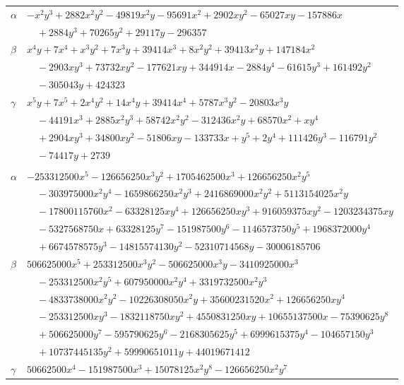 \documentclass[11pt]{article}
\begin{document}
\begin{longtable}{@{}ll@{}}
$\alpha$ & $-x^{2}y^{3}+2882x^{2}y^{2}-49819x^{2}y-95691x^{2}+2902xy^{2}-65027xy-157886x$\\
 & $\quad +2884y^{3}+70265y^{2}+29117y-296357$\\
$\beta$ & $x^{4}y+7x^{4}+x^{3}y^{2}+7x^{3}y+39414x^{3}+8x^{2}y^{2}+39413x^{2}y+147184x^{2}$\\
 & $\quad -2903xy^{3}+73732xy^{2}-177621xy+344914x-2884y^{4}-61615y^{3}+161492y^{2}$\\
 & $\quad -305043y+424323$\\
$\gamma$ & $x^{5}y+7x^{5}+2x^{4}y^{2}+14x^{4}y+39414x^{4}+5787x^{3}y^{2}-20803x^{3}y$\\
 & $\quad -44191x^{3}+2885x^{2}y^{3}+58742x^{2}y^{2}-312436x^{2}y+68570x^{2}+xy^{4}$\\
 & $\quad +2904xy^{3}+34800xy^{2}-51806xy-133733x+y^{5}+2y^{4}+111426y^{3}-116791y^{2}$\\
 & $\quad -74417y+2739$\\
\addlinespace[3pt]
\multicolumn{2}{@{}l}{$\{i,j\}=\{32,212\}$, $k_{ij}=2^{5}\cdot 3^{4}\cdot 5^{5}\cdot 7\cdot 11\cdot 13$}\\
$\alpha$ & $-253312500x^{5}-126656250x^{3}y^{2}+1705462500x^{3}+126656250x^{2}y^{5}$\\
 & $\quad -303975000x^{2}y^{4}-1659866250x^{2}y^{3}+2416869000x^{2}y^{2}+5113154025x^{2}y$\\
 & $\quad -17800115760x^{2}-63328125xy^{4}+126656250xy^{3}+916059375xy^{2}-1203234375xy$\\
 & $\quad -5327568750x+63328125y^{7}-151987500y^{6}-1146573750y^{5}+1968372000y^{4}$\\
 & $\quad +6674578575y^{3}-14815574130y^{2}-52310714568y-30006185706$\\
$\beta$ & $506625000x^{5}+253312500x^{3}y^{2}-506625000x^{3}y-3410925000x^{3}$\\
 & $\quad -253312500x^{2}y^{5}+607950000x^{2}y^{4}+3319732500x^{2}y^{3}$\\
 & $\quad -4833738000x^{2}y^{2}-10226308050x^{2}y+35600231520x^{2}+126656250xy^{4}$\\
 & $\quad -253312500xy^{3}-1832118750xy^{2}+4550831250xy+10655137500x-75390625y^{8}$\\
 & $\quad +506625000y^{7}-595790625y^{6}-2168305625y^{5}+6999615375y^{4}-104657150y^{3}$\\
 & $\quad +10737445135y^{2}+59990651011y+44019671412$\\
$\gamma$ & $50662500x^{4}-151987500x^{3}+15078125x^{2}y^{8}-126656250x^{2}y^{7}$\\

\end{longtable}
\end{document}
